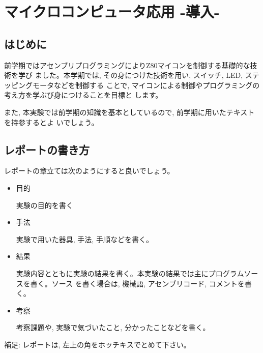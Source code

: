 
\setcounter{chapter}{-1}
\chapter{マイクロコンピュータ応用 -導入-}
\section{はじめに}

前学期ではアセンブリプログラミングによりZ80マイコンを制御する基礎的な技術を学び
ました。本学期では, その身につけた技術を用い, スイッチ, LED, ステッピングモータなどを制御する
ことで, マイコンによる制御やプログラミングの考え方を学ぶび身につけることを目標と
します。

また, 本実験では前学期の知識を基本としているので, 前学期に用いたテキストを持参するとよ
いでしょう。

\section{レポートの書き方}


レポートの章立ては次のようにすると良いでしょう。

\begin{itemize}
\item 目的

      実験の目的を書く

\item 手法

      実験で用いた器具, 手法, 手順などを書く。

\item 結果

      実験内容とともに実験の結果を書く。本実験の結果では主にプログラムソースを書く。ソース
      を書く場合は, 機械語, アセンブリコード, コメントを書く。

\item 考察

考察課題や, 実験で気づいたこと, 分かったことなどを書く。

\end{itemize}

補足: レポートは, 左上の角をホッチキスでとめて下さい。


